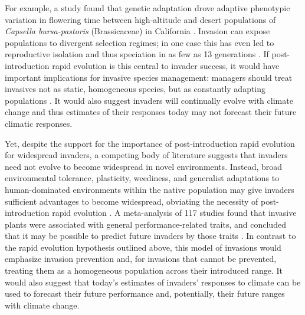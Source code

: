 \documentclass[11pt]{article}\usepackage[]{graphicx}\usepackage[]{color}
\begin{document}
    For example, a study found that genetic adaptation drove adaptive phenotypic variation in flowering time between high-altitude and desert populations of \textit{Capsella bursa-pastoris} (Brassicaceae) in California \parencite{Linde2001}. Invasion can expose populations to divergent selection regimes; in one case this has even led to reproductive isolation and thus speciation in as few as 13 generations \parencite{Hendry2000}. If post-introduction rapid evolution is this central to invader success, it would have important implications for invasive species management: managers should treat invasives not as static, homogeneous species, but as constantly adapting populations \parencite{Lee2002invasion}. It would also suggest invaders will continually evolve with climate change and thus estimates of their responses today may not forecast their future climatic responses. 
	
	Yet, despite the support for the importance of post-introduction rapid evolution for widespread invaders, a competing body of literature suggests that invaders need not evolve to become widespread in novel environments. Instead, broad environmental tolerance, plasticity, weediness, and generalist adaptations to human-dominated environments within the native population may give invaders sufficient advantages to become widespread, obviating the necessity of post-introduction rapid evolution  \parencite{Richards2006,Schwartz1994,Bock2015,Rejmanek1996,Baker1965}. A meta-analysis of 117 studies found that invasive plants were associated with general performance-related traits, and concluded that it may be possible to predict future invaders by those traits \parencite{VanKleunen2010}. %
	In contrast to the rapid evolution hypothesis outlined above, this model of invasions would emphasize invasion prevention and, for invasions that cannot be prevented, treating them as a homogeneous population across their introduced range. It would also suggest that today's estimates of invaders' responses to climate can be used to forecast their future performance and, potentially, their future ranges with climate change. 
	
\end{document}
